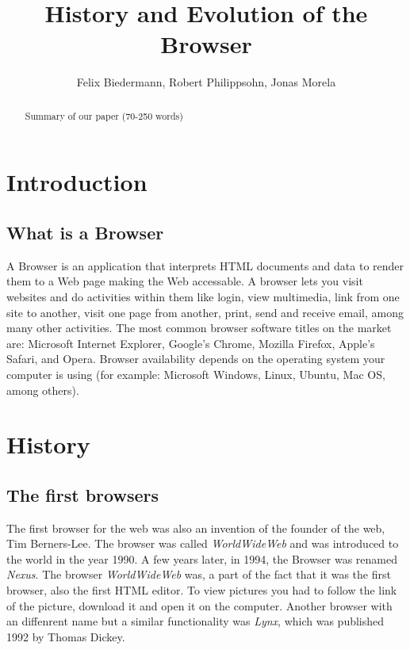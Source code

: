 \documentclass[runningheads]{llncs}
\title{History and Evolution of the Browser}
\author{Felix Biedermann, Robert Philippsohn, Jonas Morela}
\institute{University of Stuttgart, Institute for Architecture of Application Systems \\
Universitätsstraße 38, 70569 Stuttgart, Germany}
\begin{document}
\raggedbottom
\maketitle

	\begin{abstract}
		Summary of our paper (70-250 words)
	\end{abstract}

\clearpage
	\section{Introduction}
		\subsection{What is a Browser}
		A Browser is an application that interprets HTML documents and data to render them to a Web page making the Web accessable. A browser lets you visit websites and do activities within them like login, view multimedia, link from one site to another, visit one page from another, print, send and receive email, among many other activities. The most common browser software titles on the market are: Microsoft Internet Explorer, Google's Chrome, Mozilla Firefox, Apple's Safari, and Opera. Browser availability depends on the operating system your computer is using (for example: Microsoft Windows, Linux, Ubuntu, Mac OS, among others).

	\section{History}
		\subsection{The first browsers}
		The first browser for the web was also an invention of the founder of the web, Tim Berners-Lee. The browser was called \textit{WorldWideWeb} and was introduced to the world in the year 1990. A few years later, in 1994, the Browser was renamed \textit{Nexus}. The browser \textit{WorldWideWeb} was, a part of the fact that it was the first browser, also the first HTML editor.
		To view pictures you had to follow the link of the picture, download it and open it on the computer. Another browser with an diffenrent name but a similar functionality was \textit{Lynx}, which was published 1992 by Thomas Dickey.
\end{document}
